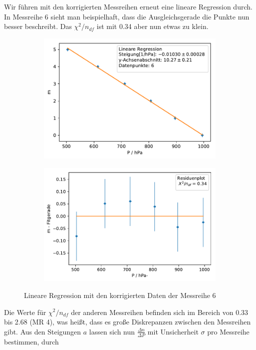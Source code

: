 \documentclass[12pt,a4paper]{article}
\begin{document}
Wir führen mit den korrigierten Messreihen erneut eine lineare Regression durch. In Messreihe 6 sieht man beispielhaft, dass die Ausgleichsgerade die Punkte nun besser beschreibt. Das $\chi^2/n_{df}$ ist mit 0.34 aber nun etwas zu klein.
\begin{figure}[H]
	\centering
	\begin{subfigure}{0.49\textwidth}
		\centering
		\includegraphics[width=\textwidth]{Python/MR6_LinReg.pdf}
	\end{subfigure}
	\begin{subfigure}{0.49\textwidth}
		\centering
		\includegraphics[width=\textwidth]{Python/MR6_Residuen.pdf}
	\end{subfigure}
	\caption{Lineare Regression mit den korrigierten Daten der Messreihe 6}
	\label{MR6_LinReg}
\end{figure}
Die Werte für $\chi^2/n_{df}$  der anderen Messreihen befinden sich im Bereich von 0.33 bis 2.68 (MR 4), was heißt, dass es große Diskrepanzen zwischen den Messreihen gibt. Aus den Steigungen $a$ lassen sich nun $\frac{\Delta n}{\Delta P}$ mit Unsicherheit $\sigma$ pro Messreihe bestimmen, durch
\end{document}
